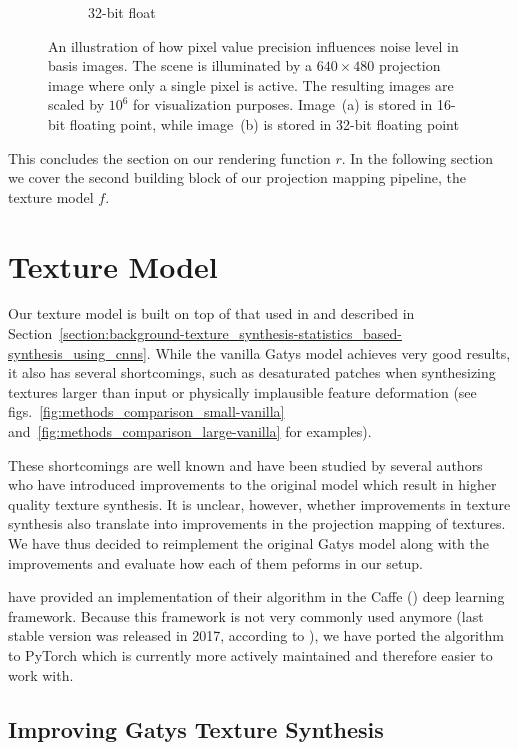 \begin{figure}[]
\begin{subfigure}[b]{0.48\textwidth}
        \caption{32-bit float}
        \label{fig:methods_float32}
    \end{subfigure}
    \caption{An illustration of how pixel value precision influences noise level in basis images. The scene is illuminated by a \(640 \times 480\) projection image where only a single pixel is active. The resulting images are scaled by \(10^6\) for visualization purposes. Image~(a) is stored in 16-bit floating point, while image~(b) is stored in 32-bit floating point}
    \label{fig:methods_float}
\end{figure}

This concludes the section on our rendering function \(r\). In the following section we cover the second building block of our projection mapping pipeline, the texture model \(f\).

\section{Texture Model}
\label{section:methods-texture_model}

Our texture model is built on top of that used in \citet{Gatys2015} and described in Section~\ref{section:background-texture_synthesis-statistics_based-synthesis_using_cnns}. While the vanilla Gatys model achieves very good results, it also has several shortcomings, such as desaturated patches when synthesizing textures larger than input or physically implausible feature deformation (see figs.~\ref{fig:methods_comparison_small-vanilla} and~\ref{fig:methods_comparison_large-vanilla} for examples).

These shortcomings are well known and have been studied by several authors who have introduced improvements to the original model which result in higher quality texture synthesis. It is unclear, however, whether improvements in texture synthesis also translate into improvements in the projection mapping of textures. We have thus decided to reimplement the original Gatys model along with the improvements and evaluate how each of them peforms in our setup.

\citet{Gatys2015} have provided an implementation of their algorithm in the Caffe (\citet{Jia2014}) deep learning framework. Because this framework is not very commonly used anymore (last stable version was released in 2017, according to \citet{CaffeGitHub}), we have ported the algorithm to PyTorch which is currently more actively maintained and therefore easier to work with.

\subsection{Improving Gatys Texture Synthesis}
\label{section:methods-texture_model-improvements}

